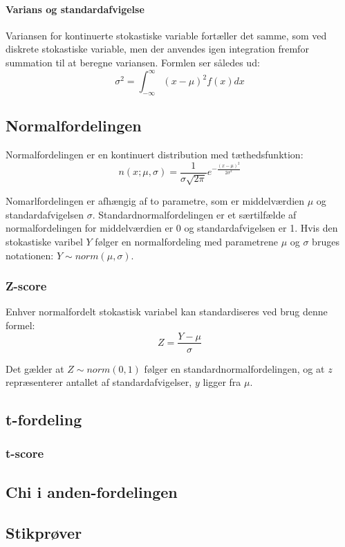\paragraph{Varians og standardafvigelse} Variansen for kontinuerte stokastiske variable fortæller det samme, som ved diskrete stokastiske variable, men der anvendes igen integration fremfor summation til at beregne variansen. Formlen ser således ud:
$$\sigma^2=\int_{-\infty}^{\infty}(x-\mu)^2f(x)dx$$ 


\subsection{Normalfordelingen}
Normalfordelingen er en kontinuert distribution med tæthedsfunktion:
$$n(x;\mu, \sigma)=\frac{1}{\sigma\sqrt{2\pi}}e^{-\frac{(x-\mu)^2}{2\sigma^2}}$$

Nomarlfordelingen er afhængig af to parametre, som er middelværdien $\mu$ og standardafvigelsen $\sigma$.
Standardnormalfordelingen er et særtilfælde af normalfordelingen for middelværdien er 0 og standardafvigelsen er 1.
Hvis den stokastiske varibel $Y$ følger en normalfordeling med parametrene $\mu$ og $\sigma$ bruges notationen:
$Y \sim norm(\mu,\sigma)$.

\subsubsection{Z-score}
Enhver normalfordelt stokastisk variabel kan standardiseres ved brug denne formel:
$$Z=\frac{Y-\mu}{\sigma}$$

Det gælder at $Z \sim norm(0,1)$ følger en standardnormalfordelingen, og at $z$ repræsenterer antallet af standardafvigelser, $y$ ligger fra $\mu$. 

\subsection{t-fordeling}

\subsubsection{t-score}

\subsection{Chi i anden-fordelingen}

\subsection{Stikprøver}
